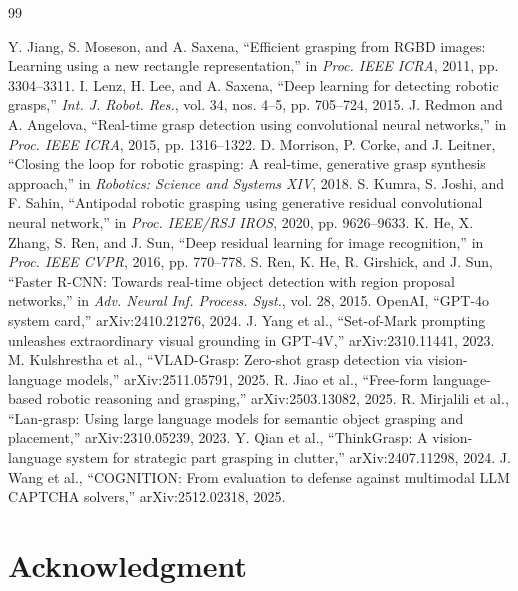 \documentclass[12pt,letterpaper]{article}
\begin{document}

\newpage
\begin{thebibliography}{99}
 Y. Jiang, S. Moseson, and A. Saxena, ``Efficient grasping from RGBD images: Learning using a new rectangle representation,'' in \emph{Proc. IEEE ICRA}, 2011, pp. 3304--3311.
 I. Lenz, H. Lee, and A. Saxena, ``Deep learning for detecting robotic grasps,'' \emph{Int. J. Robot. Res.}, vol. 34, nos. 4--5, pp. 705--724, 2015.
 J. Redmon and A. Angelova, ``Real-time grasp detection using convolutional neural networks,'' in \emph{Proc. IEEE ICRA}, 2015, pp. 1316--1322.
 D. Morrison, P. Corke, and J. Leitner, ``Closing the loop for robotic grasping: A real-time, generative grasp synthesis approach,'' in \emph{Robotics: Science and Systems XIV}, 2018.
 S. Kumra, S. Joshi, and F. Sahin, ``Antipodal robotic grasping using generative residual convolutional neural network,'' in \emph{Proc. IEEE/RSJ IROS}, 2020, pp. 9626--9633.
 K. He, X. Zhang, S. Ren, and J. Sun, ``Deep residual learning for image recognition,'' in \emph{Proc. IEEE CVPR}, 2016, pp. 770--778.
 S. Ren, K. He, R. Girshick, and J. Sun, ``Faster R-CNN: Towards real-time object detection with region proposal networks,'' in \emph{Adv. Neural Inf. Process. Syst.}, vol. 28, 2015.
 OpenAI, ``GPT-4o system card,'' arXiv:2410.21276, 2024.
 J. Yang et al., ``Set-of-Mark prompting unleashes extraordinary visual grounding in GPT-4V,'' arXiv:2310.11441, 2023.
 M. Kulshrestha et al., ``VLAD-Grasp: Zero-shot grasp detection via vision-language models,'' arXiv:2511.05791, 2025.
 R. Jiao et al., ``Free-form language-based robotic reasoning and grasping,'' arXiv:2503.13082, 2025.
 R. Mirjalili et al., ``Lan-grasp: Using large language models for semantic object grasping and placement,'' arXiv:2310.05239, 2023.
 Y. Qian et al., ``ThinkGrasp: A vision-language system for strategic part grasping in clutter,'' arXiv:2407.11298, 2024.
 J. Wang et al., ``COGNITION: From evaluation to defense against multimodal LLM CAPTCHA solvers,'' arXiv:2512.02318, 2025.
\end{thebibliography}

\newpage
\section*{Acknowledgment}
\end{document}
